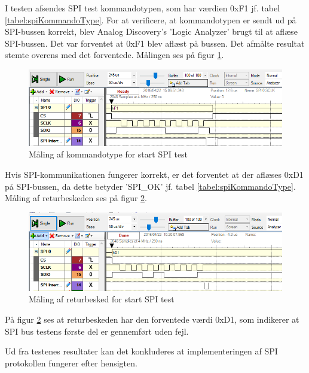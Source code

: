 \noindent I testen afsendes SPI test kommandotypen, som har værdien 0xF1 jf. tabel \ref{tabel:spiKommandoType}. For at verificere, at kommandotypen er sendt ud på SPI-bussen korrekt, blev Analog Discovery's 'Logic Analyzer' brugt til at aflæse SPI-bussen. Det var forventet at 0xF1 blev aflæst på bussen. Det afmålte resultat stemte overens med det forventede. Målingen ses på figur \ref{fig:SPItestkommandotype}. 

\begin{figure}[H]
	\centering
	\includegraphics[width=\textwidth]{Test/images/SPItest/SPItestkommandotype}
	\caption{Måling af kommandotype for start SPI test}
	\label{fig:SPItestkommandotype}
\end{figure}

\noindent Hvis SPI-kommunikationen fungerer korrekt, er det forventet at der aflæses 0xD1 på SPI-bussen, da dette betyder 'SPI\_OK' jf. tabel \ref{tabel:spiKommandoType}. Måling af returbeskeden ses på figur \ref{fig:SPItestSPIOK}.

\begin{figure}[H]
	\centering
	\includegraphics[width=\textwidth]{Test/images/SPItest/SPItestSPIOK1}
	\caption{Måling af returbesked for start SPI test} 
	\label{fig:SPItestSPIOK}
\end{figure}

\noindent På figur \ref{fig:SPItestSPIOK} ses at returbeskeden har den forventede værdi 0xD1, som indikerer at SPI bus testens første del er gennemført uden fejl. \newline

\noindent Ud fra testenes resultater kan det konkluderes at implementeringen af SPI protokollen fungerer efter hensigten.

